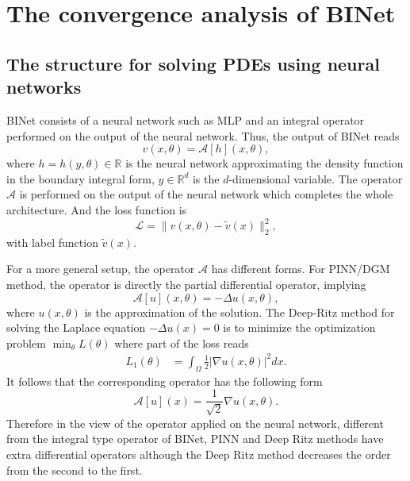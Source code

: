 \documentclass[hyperref]{article}
\numberwithin{equation}{section}
\theoremstyle{nonumberplain}
\begin{document}
	
	\section{The convergence analysis of BINet}
	
	\subsection{The structure for solving PDEs using neural networks}\label{ap.pdeneural}
	BINet consists of a neural network such as MLP and an integral operator performed on the output of the neural network. 
	Thus, the output of BINet reads $$v(x,\theta)=\mathcal{A}[h](x,\theta),$$ 
	where $h=h(y,\theta)\in\mathbb{R}$ is the neural network approximating the density function in the boundary integral form, $y \in\mathbb{R}^d$ is the $d$-dimensional variable. The operator $\mathcal{A}$ is performed on the output of the neural network which completes the whole architecture.  And the loss function is  $$\mathcal{L} = \|v(x,\theta)-\tilde{v}(x)\|^2_2,$$ with label function $\tilde{v}(x)$.
	
	For a more general setup, the operator $\mathcal{A}$ has different forms. 
	For PINN/DGM method, the operator is directly the partial differential operator, implying
	\begin{equation*} 
		\mathcal{A}[u](x,\theta) = -\Delta u(x,\theta),
	\end{equation*}
	where $u(x,\theta)$ is the approximation of the solution.
	The Deep-Ritz method for solving the Laplace equation $-\Delta u(x) = 0$ is to minimize the optimization problem $\min_{\theta} L(\theta)$  where part of the loss reads
	\begin{align*}
		L_1(\theta)&=\int_{\Omega}\frac{1}{2}|\nabla u(x,\theta)|^2dx.
	\end{align*}
	It follows that the corresponding operator has the following form
	\begin{equation*}
		\mathcal{A}[u](x) = \frac{1}{\sqrt{2}}\nabla u(x,\theta).
	\end{equation*}
	Therefore in the view of the operator applied on the neural network, different from the integral type operator of BINet, PINN and Deep Ritz methods have extra differential operators although the Deep Ritz method decreases the order from the second to the first.
	
\end{document}
